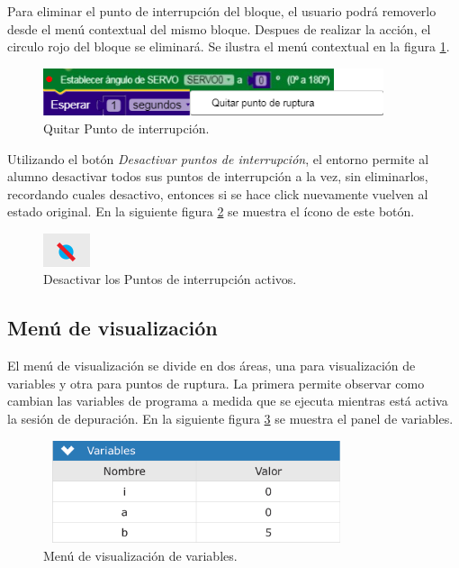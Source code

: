 Para eliminar el punto de interrupción del bloque, el usuario podrá removerlo desde el menú contextual del mismo bloque. Despues de realizar la acción, el circulo rojo del bloque se eliminará. Se ilustra el menú contextual en la figura \ref{fig:breakpoint-eliminar}.

\begin{figure}[!htbp]
	\centering
	\includegraphics[width=10cm]{./Figures/breakpoint-eliminar.PNG}
	\caption{Quitar Punto de interrupción.}
	\label{fig:breakpoint-eliminar}
\end{figure}

Utilizando el botón \emph{Desactivar puntos de interrupción}, el entorno permite al alumno desactivar todos sus puntos de interrupción a la vez, sin eliminarlos, recordando cuales desactivo, entonces si se hace click nuevamente vuelven al estado original.
En la siguiente figura \ref{fig:desactivar-breakpoints} se muestra el ícono de este botón.

\begin{figure}[!htbp]
	\begin{center}  %
		\includegraphics[scale=.90]{./Figures/desactivar-breakpoints.PNG}
		\par\caption{Desactivar los Puntos de interrupción activos.}\label{fig:desactivar-breakpoints}
	\end{center}
\end{figure}

\subsection{Menú de visualización}
\label{subsec:Iniciar/Menú de visualización}

El menú de visualización se divide en dos áreas, una para visualización de variables y otra para puntos de ruptura. La primera permite observar como cambian las variables de programa a medida que se ejecuta mientras está activa la sesión de depuración. En la siguiente figura \ref{fig:ventana-variables} se muestra el panel de variables.

\begin{figure}[!htbp]
	\centering
	\includegraphics*[width=9cm,height=3cm]{./Figures/variables.PNG}
	\caption{Menú de visualización de variables.}
	\par\label{fig:ventana-variables}
\end{figure}

